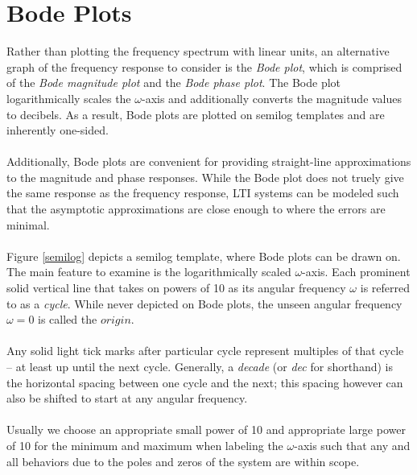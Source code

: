 \documentclass{report}
\begin{document}
\section{Bode Plots}
Rather than plotting the frequency spectrum with linear units, an alternative graph of the frequency response to consider is the \emph{Bode plot}, which is comprised 
of the \emph{Bode magnitude plot} and the \emph{Bode phase plot}. The Bode plot logarithmically scales the $\omega$-axis and additionally converts the magnitude 
values to decibels. As a result, Bode plots are plotted on semilog templates and are inherently one-sided.
\\ \\ 
Additionally, Bode plots are convenient for providing straight-line approximations to the magnitude and phase responses. While the Bode plot does not truely give the same response as the 
frequency response, LTI systems can be modeled such that the asymptotic approximations are close enough to where the errors are minimal. 
\\ \\
Figure \ref{semilog} depicts a semilog template, where Bode plots can be drawn on. The main feature to examine is the logarithmically scaled $\omega$-axis. Each prominent solid vertical line that 
takes on powers of 10 as its angular frequency $\omega$ is referred to as a \emph{cycle}. While never depicted on Bode plots, the unseen angular frequency $\omega=0$ is called the $origin$. 
\\ \\
Any solid light tick marks after particular cycle represent multiples of that cycle -- at least up until 
the next cycle. Generally, a \emph{decade} (or \emph{dec} for shorthand) is the horizontal spacing between one cycle and the next; this spacing however can also be shifted to start at any angular frequency.
\\ \\
Usually we choose an appropriate small power of 10 and appropriate large power of 10 for the minimum and maximum 
when labeling the $\omega$-axis such that any and all behaviors due to the poles and zeros of the system are within scope. 
\end{document}
